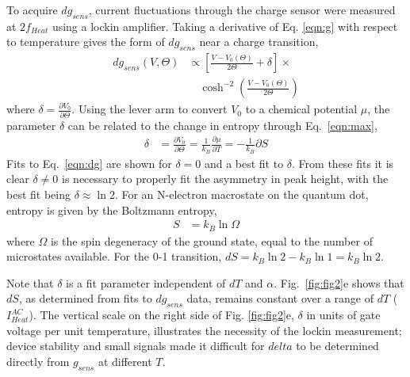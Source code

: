 \documentclass[twocolumn,showpacs,preprintnumbers,amsmath,amssymb,pra,aps,superscriptaddress]{revtex4-1}
\begin{document}
To acquire $dg_{sens}$, current fluctuations through the charge sensor were measured at $2f_{Heat}$ using a lockin amplifier. Taking a derivative of Eq. \ref{eqn:g} with respect to temperature gives the form of $dg_{sens}$ near a charge transition,
%
\begin{align}
\label{eqn:dg}
        dg_{sens}(V, \Theta) &\propto \left[ \frac{V-V_0(\Theta)}{2\Theta} + \delta \right]\times \\
        				      &\quad\cosh^{-2}\left(\frac{V-V_0(\Theta)}{2\Theta}\right) \nonumber
\end{align}
%
where $\delta=\frac{\partial V_0}{\partial \Theta}$. Using the lever arm to convert $V_0$ to a chemical potential $\mu$, the parameter $\delta$ can be related to the change in entropy through Eq.~\ref{eqn:max},
%
\begin{align}
\label{eqn:delta}
        \delta &= \frac{\partial V_0}{\partial \Theta} = 
        \frac{1}{k_B} \frac{\partial \mu}{\partial T} = 
        -\frac{1}{k_B} \partial S
\end{align}
%
Fits to Eq.~\ref{eqn:dg} are shown for $\delta=0$ and a best fit to $\delta$. From these fits it is clear $\delta\neq0$ is necessary to properly fit the asymmetry in peak height, with the best fit being $\delta \approx \ln{2}$. For an N-electron macrostate on the quantum dot, entropy is given by the Boltzmann entropy,
%
\begin{align}
\label{eqn:S}
        S &= k_B \ln{\Omega}
\end{align}
%
where $\Omega$ is the spin degeneracy of the ground state, equal to the number of microstates available. For the 0-1 transition, $dS =  k_B\ln{2} - k_B \ln{1} = k_B\ln{2}$.

Note that $\delta$ is a fit parameter independent of $dT$ and $\alpha$. Fig.~\ref{fig:fig2}e shows that $dS$, as determined from fits to $dg_{sens}$ data, remains constant over a range of $dT$ ($I^{AC}_{Heat}$). The vertical scale on the right side of Fig. \ref{fig:fig2}e, $\delta$ in units of gate voltage per unit temperature, illustrates the necessity of the lockin measurement; device stability and small signals made it difficult for $delta$ to be determined directly from $g_{sens}$ at different $T$.
\end{document}
